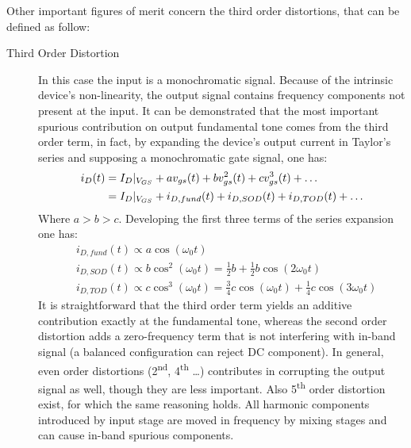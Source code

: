 Other important figures of merit concern the third order distortions, that can be defined as follow:
\begin{description}
	\item [Third Order Distortion] In this case the input is a monochromatic signal. Because of the intrinsic device's non-linearity, the output signal contains frequency components not present at the input. It can be demonstrated that the most important spurious contribution on output fundamental tone comes from the third order term, in fact, by expanding the device's output current in Taylor's series and supposing a monochromatic gate signal, one has:
	\begin{align}
		i_D(t) &= I_D|_{V_{GS}}+av_{gs}(t)+bv_{gs}^2(t)+cv_{gs}^3(t)+\dots \notag \\
		&=I_D|_{V_{GS}}+i_{D,fund}(t)+i_{D,SOD}(t)+	i_{D,TOD}(t)+\dots
	\end{align}
	Where $a>b>c$. Developing the first three terms of the series expansion one has:
	\begin{align}
	&i_{D,fund}(t) \propto a\cos(\omega_0 t) \\
	&i_{D,SOD}(t) \propto b\cos^2(\omega_0 t) =\frac{1}{2}b+\frac{1}{2}b\cos(2\omega_0 t) \\
	&i_{D,TOD}(t) \propto c\cos^3(\omega_0 t) = \frac{3}{4}c\cos(\omega_0 t) +\frac{1}{4}c\cos(3\omega_0 t)
	\end{align} 
	It is straightforward that the third order term yields an additive contribution exactly at the fundamental tone, whereas the second order distortion adds a zero-frequency term that is not interfering with in-band signal (a balanced configuration can reject DC component). In general, even order distortions (2\textsuperscript{nd}, 4\textsuperscript{th} \dots) contributes in corrupting the output signal as well, though they are less important. Also 5\textsuperscript{th} order distortion exist, for which the same reasoning holds.
	All harmonic components introduced by input stage are moved in frequency by mixing stages and can cause in-band spurious components.
	

\end{description}
